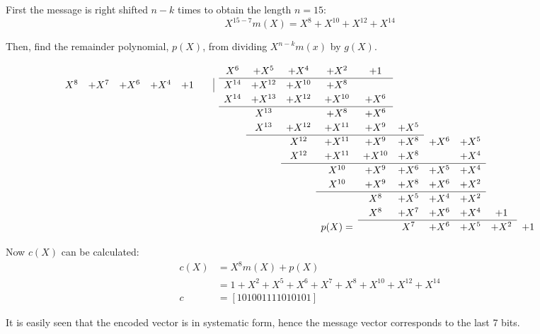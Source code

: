 \documentclass[Main]{subfiles}
\begin{document}
First the message is right shifted $n-k$ times to obtain the length $n=15$:
\begin{equation}
X^{15-7}m(X) = X^8+X^{10}+X^{12}+X^{14}
\end{equation}

Then, find the remainder polynomial, $p(X)$, from dividing $X^{n-k}m(x)$ by $g(X)$.

\[
\renewcommand\arraystretch{1.2}
\begin{array}{cccccccccccccccccc}
& & & & & X^6 & + X^5 &  +X^4 & +X^2 & +1 & & & & & & & \\
\cline{6-10}
 X^8 & + X^7 & +X^6 & +X^4 & +1 \qquad \vline & X^{14} & +X^{12} & +X^{10} & + X^8 & & & & & & & & \\
& & & & & X^{14} & + X^{13}& + X^{12} & +X^{10} & +X^6 & & & & & & & \\
\cline{6-10}
& & & & & & X^{13} & & +X^8 & +X^6 & & & & & & &\\
&  &&    &&    &  X^{13} & +X^{12} & +X^{11} & +X^9 & +X^5 & \\
\cline{7-11}
& & &&  &&    &  X^{12} & +X^{11} & +X^9 & +X^8 & +X^6 & +X^5  \\
& & &&  &&    &  X^{12} & +X^{11} & +X^{10} & +X^8 & & +X^4  \\
\cline{8-13}
&  &&    &    &   & &  & X^{10} & +X^9 & +X^6 & +X^5 & +X^4 \\
&  &&    &    &   & &  & X^{10} & +X^9 & +X^8 & +X^6 & +X^2 \\
\cline{9-13}
&  &&    &    &   & & & & X^{8} & +X^5 & +X^4 & +X^2 \\
&  &&    &    &   & & & & X^{8} & +X^7 & +X^6 & +X^4 & +1 \\
\cline{10-14}
&  &&  & & & & & p(X) = & & X^{7} & +X^6 & +X^5 & +X^2 & +1 \\
\end{array}
\]

Now $c(X)$ can be calculated:
\begin{align}
c(X) &= X^8m(X)+p(X)\\ 
	&= 1 + X^2 + X^5 + X^6 + X^7 + X^8 + X^{10}+ X^{12} + X^{14} \\
c &= [1 0 1 0 0 1 1 1 1 0 1 0 1 0 1]
\end{align}

It is easily seen that the encoded vector is in systematic form, hence the message vector corresponds to the last 7 bits.
\end{document}
